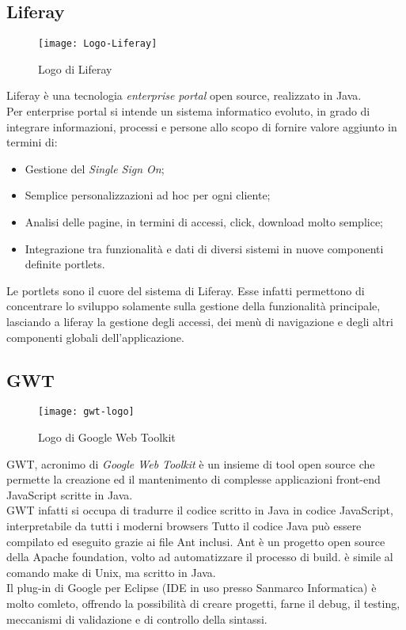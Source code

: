 \subsection{Liferay}
\begin{figure}[h]
	\centering
	\texttt{[image: Logo-Liferay]}
	\caption{Logo di Liferay}
\end{figure}
Liferay è una tecnologia \emph{enterprise portal} open source, realizzato in Java.\\
Per enterprise portal si intende un sistema informatico evoluto, in grado di integrare informazioni, processi e persone allo scopo di fornire valore aggiunto in termini di:
\begin{itemize}
	\item Gestione del \emph{Single Sign On};
	\item Semplice personalizzazioni ad hoc per ogni cliente;
	\item Analisi delle pagine, in termini di accessi, click, download molto semplice;
	\item Integrazione tra funzionalità e dati di diversi sistemi in nuove componenti definite portlets. 
\end{itemize}
Le portlets sono il cuore del sistema di Liferay. Esse infatti permettono di concentrare lo sviluppo solamente sulla gestione della funzionalità principale, lasciando a liferay la gestione degli accessi, dei menù di navigazione e degli altri componenti globali dell'applicazione.\\

\subsection{GWT}
\begin{figure}[h]
	\centering
	\texttt{[image: gwt-logo]}
	\caption{Logo di Google Web Toolkit}
\end{figure} 
GWT, acronimo di \emph{Google Web Toolkit} è un insieme di tool open source che permette la creazione ed il mantenimento di complesse applicazioni front-end JavaScript scritte in Java.\\
GWT infatti si occupa di tradurre il codice scritto in Java in codice JavaScript, interpretabile da tutti i moderni browsers Tutto il codice Java può essere compilato ed eseguito grazie ai file Ant inclusi.
Ant è un progetto open source della Apache foundation, volto ad automatizzare il processo di build. è simile al comando make di Unix, ma scritto in Java. \\ %
Il plug-in di Google per Eclipse (IDE in uso presso Sanmarco Informatica) è molto comleto, offrendo la possibilità di creare progetti, farne il debug, il testing, meccanismi di validazione e di controllo della sintassi.\\
